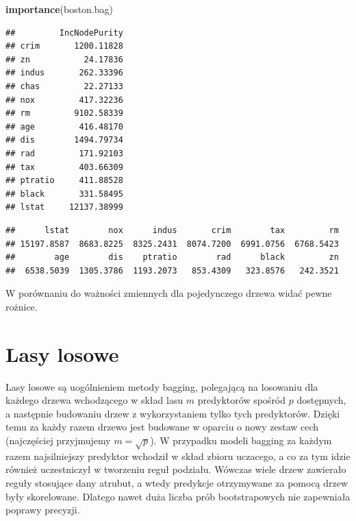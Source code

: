 \documentclass[]{book}
\newenvironment{Shaded}{\begin{snugshade}}{\end{snugshade}}
\newcommand{\KeywordTok}[1]{\textcolor[rgb]{0.13,0.29,0.53}{\textbf{#1}}}
\newcommand{\NormalTok}[1]{#1}
\newcommand{\OperatorTok}[1]{\textcolor[rgb]{0.81,0.36,0.00}{\textbf{#1}}}
\theoremstyle{plain}
\theoremstyle{definition}
\begin{document}
\begin{Shaded}
\begin{Highlighting}[]
\KeywordTok{importance}\NormalTok{(boston.bag)}
\end{Highlighting}
\end{Shaded}

\begin{verbatim}
##         IncNodePurity
## crim       1200.11828
## zn           24.17836
## indus       262.33396
## chas         22.27133
## nox         417.32236
## rm         9102.58339
## age         416.48170
## dis        1494.79734
## rad         171.92103
## tax         403.66309
## ptratio     411.88528
## black       331.58495
## lstat     12137.38999
\end{verbatim}

\begin{Shaded}
\end{Shaded}

\begin{verbatim}
##      lstat        nox      indus       crim        tax         rm 
## 15197.8587  8683.8225  8325.2431  8074.7200  6991.0756  6768.5423 
##        age        dis    ptratio        rad      black         zn 
##  6538.5039  1305.3786  1193.2073   853.4309   323.8576   242.3521
\end{verbatim}

W porównaniu do ważności zmiennych dla pojedynczego drzewa widać pewne rożnice.

\hypertarget{lasy-losowe}{%
\section{Lasy losowe}\label{lasy-losowe}}

Lasy losowe są uogólnieniem metody bagging, polegającą na losowaniu dla każdego drzewa wchodzącego w skład lasu \(m\) predyktorów spośród \(p\) dostępnych, a następnie budowaniu drzew z wykorzystaniem tylko tych predyktorów. Dzięki temu za każdy razem drzewo jest budowane w oparciu o nowy zestaw cech (najczęściej przyjmujemy \(m=\sqrt{p}\)). W przypadku modeli bagging za każdym razem najsilniejszy predyktor wchodził w skład zbioru uczacego, a co za tym idzie również uczestniczył w tworzeniu reguł podziału. Wówczas wiele drzew zawierało reguły stosujące dany atrubut, a wtedy predykcje otrzymywane za pomocą drzew były skorelowane. Dlatego nawet duża liczba prób bootstrapowych nie zapewniała poprawy precyzji.
\end{document}
